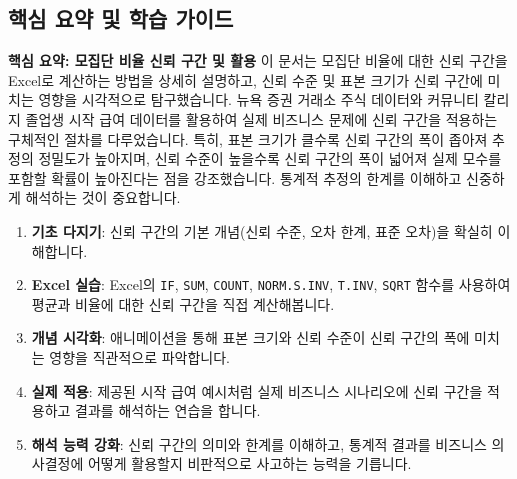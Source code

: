 \documentclass[11pt,a4paper]{book}
\newcommand{\excel}[1]{\texttt{#1}}
\theoremstyle{definition}
\begin{document}
\begin{enumerate}
\begin{enumerate}


\section{핵심 요약 및 학습 가이드}

\begin{summarybox}
    \textbf{핵심 요약: 모집단 비율 신뢰 구간 및 활용}
    이 문서는 모집단 비율에 대한 신뢰 구간을 Excel로 계산하는 방법을 상세히 설명하고, 신뢰 수준 및 표본 크기가 신뢰 구간에 미치는 영향을 시각적으로 탐구했습니다. 뉴욕 증권 거래소 주식 데이터와 커뮤니티 칼리지 졸업생 시작 급여 데이터를 활용하여 실제 비즈니스 문제에 신뢰 구간을 적용하는 구체적인 절차를 다루었습니다. 특히, 표본 크기가 클수록 신뢰 구간의 폭이 좁아져 추정의 정밀도가 높아지며, 신뢰 수준이 높을수록 신뢰 구간의 폭이 넓어져 실제 모수를 포함할 확률이 높아진다는 점을 강조했습니다. 통계적 추정의 한계를 이해하고 신중하게 해석하는 것이 중요합니다.
\end{summarybox}

\begin{examplebox}[title=학습 로드맵: 신뢰 구간 마스터하기]
    \begin{enumerate}
        \item \textbf{기초 다지기}: 신뢰 구간의 기본 개념(신뢰 수준, 오차 한계, 표준 오차)을 확실히 이해합니다.
        \item \textbf{Excel 실습}: Excel의 \excel{IF}, \excel{SUM}, \excel{COUNT}, \excel{NORM.S.INV}, \excel{T.INV}, \excel{SQRT} 함수를 사용하여 평균과 비율에 대한 신뢰 구간을 직접 계산해봅니다.
        \item \textbf{개념 시각화}: 애니메이션을 통해 표본 크기와 신뢰 수준이 신뢰 구간의 폭에 미치는 영향을 직관적으로 파악합니다.
        \item \textbf{실제 적용}: 제공된 시작 급여 예시처럼 실제 비즈니스 시나리오에 신뢰 구간을 적용하고 결과를 해석하는 연습을 합니다.
        \item \textbf{해석 능력 강화}: 신뢰 구간의 의미와 한계를 이해하고, 통계적 결과를 비즈니스 의사결정에 어떻게 활용할지 비판적으로 사고하는 능력을 기릅니다.
    \end{enumerate}
\end{examplebox}



\end{enumerate}
\end{enumerate}
\end{document}
